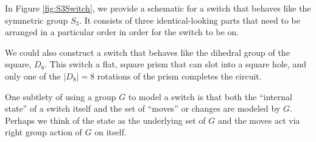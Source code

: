 \begin{example}
In Figure \ref{fig:S3Switch}, we provide a schematic for a switch that behaves
like the symmetric group $S_3$.
It consists of three identical-looking parts that need to be
arranged in a particular order in order for the switch to be on.

We could also construct a switch that behaves like the dihedral group of the
square, $D_8$. This switch a flat, square prism that can slot into a square hole,
and only one of the $|D_8| = 8$ rotations of the prism completes the circuit.
\end{example}



One subtlety of using a group $G$ to model a switch is that
both the ``internal state'' of a switch itself and
the set of ``moves'' or changes are modeled by $G$.
Perhaps we think of the state as the underlying set of $G$
and the moves act via right group action of $G$ on itself.

